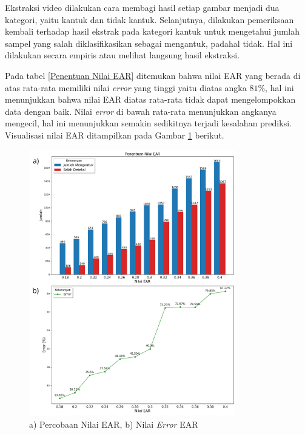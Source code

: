           Ekstraksi video dilakukan cara membagi hasil setiap gambar menjadi dua kategori, yaitu kantuk dan tidak kantuk. Selanjutnya, dilakukan pemeriksaan kembali terhadap hasil ekstrak pada kategori kantuk untuk mengetahui jumlah sampel yang salah diklasifikasikan sebagai mengantuk, padahal tidak. Hal ini dilakukan secara empiris atau melihat langsung hasil ekstraksi.


            Pada tabel \ref{Penentuan Nilai EAR} ditemukan bahwa nilai EAR yang berada di atas rata-rata memiliki nilai \textit{error} yang tinggi yaitu diatas angka $ 81\%$, hal ini menunjukkan bahwa nilai EAR diatas rata-rata tidak dapat mengelompokkan data dengan baik. Nilai \textit{error} di bawah rata-rata menunjukkan angkanya mengecil, hal ini menunjukkan semakin sedikitnya terjadi kesalahan prediksi. Visualisasi nilai EAR ditampilkan pada Gambar \ref{Eksperimen Penentuan Nilai EAR} berikut.

             \begin{figure}[H]
             \centering
                 \includegraphics[width=0.8\textwidth]{figures/bab4/penentuan nilai ear.png}
                 \caption{a) Percobaan Nilai EAR, b) Nilai \textit{Error} EAR}
                 \label{Eksperimen Penentuan Nilai EAR}
             \end{figure}


